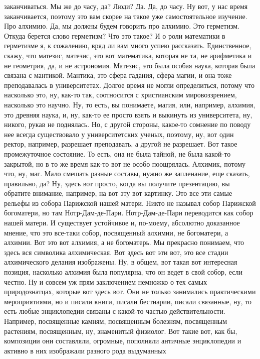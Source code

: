 заканчиваться. Мы же до часу, да? Люди? Да. Да, до часу. Ну вот, у нас время
заканчивается, поэтому это вам скорее на такое уже самостоятельное изучение. Про
алхимию. Да, мы должны будем говорить про алхимию. Это герметизм. Откуда берется
слово герметизм? Что это такое? И о роли математики в герметизме я, к сожалению,
вряд ли вам много успею рассказать. Единственное, скажу, что матезис, матезис,
это вот математика, которая не та, не арифметика и не геометрия, да, и не
астрономия. Матезис, это была особая наука, которая была связана с мантикой.
Мантика, это сфера гадания, сфера магии, и она тоже преподавалась в
университетах. Долгое время не могли определиться, потому что насколько это, ну,
как-то так, соотносится с христианским мировоззрением, насколько это научно. Ну,
то есть, вы понимаете, магия, или, например, алхимия, это древняя наука, и, ну,
как-то ее просто взять и выкинуть из университета, ну, никого, рукав не
поднялась. Но, с другой стороны, какое-то сомнение по поводу нее всегда
существовало у университетских ученых, поэтому, ну, вот один ректор, например,
разрешает преподавать, а другой не разрешает. Вот такое промежуточное состояние.
То есть, она не была тайной, не была какой-то закрытой, но в то же время как-то
вот не особо поощрялась. Алхимик, потому что, ну, маг. Мало смешать разные
составы, нужно же запленание, еще сказать, правильно, да? Ну, здесь вот просто,
когда вы получите презентацию, вы обратите внимание, например, на вот эту вот
картинку. Это все эти самые рельефы из собора Парижской нашей матери. Никто не
называл собор Парижской богоматери, но там Нотр-Дам-де-Пари. Нотр-Дам-де-Пари
переводится как собор нашей матери. И существует устойчивое и, по-моему,
абсолютно доказанное мнение, что это все-таки собор, посвященный алхимии, не
богоматери, а алхимии. Вот это вот алхимия, а не богоматерь. Мы прекрасно
понимаем, что здесь вся символика алхимическая. Вот здесь вот эти вот, это все
стадии алхимического делания изображены. Ну, в общем, вот такая вот интересная
позиция, насколько алхимия была популярна, что он ведет в свой собор, если
честно. Ну и совсем уж прям заключением немножко о тех самых природознатцах,
которые вот здесь вот. Они не только занимались практическими мероприятиями, но
и писали книги, писали бестиарии, писали связанные, ну, то есть любые
энциклопедии связаны с какой-то частью действительности. Например, посвященные
камням, посвященным болезням, посвященным растениям, посвященным, ну, знаменитый
физиолог. Вот такие вот, как бы, композиции они составляли, огромные, пополняли
античные энциклопедии и активно в них изображали разного рода выдуманных
